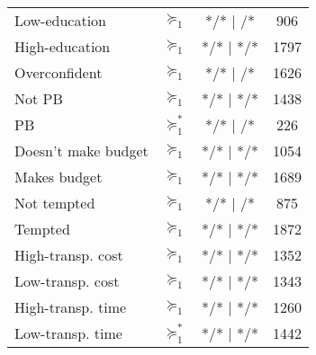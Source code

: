 \begin{tabular}{lccc}
Low-education & \cellcolor[rgb]{ .851,  .882,  .949} $\succeq_{1}$ & */*  |     /* & 906 \\
High-education & \cellcolor[rgb]{ .851,  .882,  .949} $\succeq_{1}$ & */*  |  */* & 1797 \\
Overconfident & \cellcolor[rgb]{ .851,  .882,  .949} $\succeq_{1}$ & */*  |     /* & 1626 \\
Not PB & \cellcolor[rgb]{ .851,  .882,  .949} $\succeq_{1}$ & */*  |  */* & 1438 \\
PB    & \cellcolor[rgb]{ .557,  .663,  .859} $\succeq_{1}^*$ & */*  |     /* & 226 \\
Doesn't make budget & \cellcolor[rgb]{ .851,  .882,  .949} $\succeq_{1}$ & */*  |  */* & 1054 \\
Makes budget & \cellcolor[rgb]{ .851,  .882,  .949} $\succeq_{1}$ & */*  |  */* & 1689 \\
Not tempted & \cellcolor[rgb]{ .851,  .882,  .949} $\succeq_{1}$ & */*  |     /* & 875 \\
Tempted & \cellcolor[rgb]{ .851,  .882,  .949} $\succeq_{1}$ & */*  |  */* & 1872 \\
High-transp. cost & \cellcolor[rgb]{ .851,  .882,  .949} $\succeq_{1}$ & */*  |  */* & 1352 \\
Low-transp. cost & \cellcolor[rgb]{ .851,  .882,  .949} $\succeq_{1}$ & */*  |  */* & 1343 \\
High-transp. time & \cellcolor[rgb]{ .851,  .882,  .949} $\succeq_{1}$ & */*  |  */* & 1260 \\
Low-transp. time & \cellcolor[rgb]{ .557,  .663,  .859} $\succeq_{1}^*$ & */*  |  */* & 1442 \\
\bottomrule
\bottomrule
\end{tabular}%
